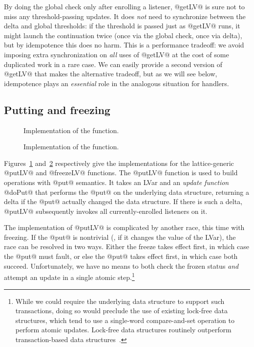 By doing the global check only after enrolling a listener, @getLV@ is
sure not to miss any threshold-passing updates.  It does \emph{not}
need to synchronize between the delta and global thresholds: if the
threshold is passed just as @getLV@ runs, it might launch the
continuation twice (once via the global check, once via delta), but by
idempotence this does no harm.  This is a performance tradeoff: we
avoid imposing extra synchronization on \emph{all} uses of @getLV@ at
the cost of some duplicated work in a rare case.  We can easily
provide a second version of @getLV@ that makes the alternative
tradeoff, but as we will see below, idempotence plays an
\emph{essential} role in the analogous situation for handlers.

\subsection{Putting and freezing}

\begin{figure}
  
  \caption{Implementation of the 
    function.}\label{fig:implementation-putLV}
\end{figure}

\begin{figure}
  
  \caption{Implementation of the 
    function.}\label{fig:implementation-freezeLV}
\end{figure}

Figures~\ref{fig:implementation-putLV}
and~\ref{fig:implementation-freezeLV} respectively give the
implementations for the lattice-generic @putLV@ and @freezeLV@
functions.  The @putLV@ function is used to build operations with
@put@ semantics.  It takes an LVar and an \emph{update function}
@doPut@ that performs the @put@ on the underlying data structure,
returning a delta if the @put@ actually changed the data structure.
If there is such a delta, @putLV@ subsequently invokes all
currently-enrolled listeners on it.

The implementation of @putLV@ is complicated by another race, this
time with freezing.  If the @put@ is nontrivial (\ie, if it changes
the value of the LVar), the race can be resolved in two ways.  Either
the freeze takes effect first, in which case the @put@ must fault, or
else the @put@ takes effect first, in which case both succeed.
Unfortunately, we have no means to both check the frozen status
\emph{and} attempt an update in a single atomic step.\footnote{While
  we could require the underlying data structure to support such
  transactions, doing so would preclude the use of existing lock-free
  data structures, which tend to use a single-word compare-and-set
  operation to perform atomic updates.  Lock-free data structures
  routinely outperform transaction-based data
  structures~\cite{practical-lock-freedom}.}

